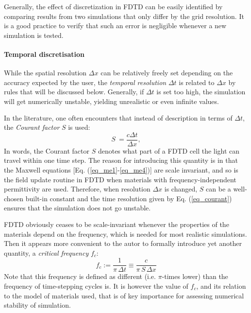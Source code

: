 Generally, the effect of discretization in FDTD can be easily identified by comparing results from two simulations that only differ by the grid resolution. It is a good practice to verify that such an error is negligible whenever a new simulation is tested.

\paragraph{Temporal discretisation} %
While the spatial resolution $\Delta x$ can be relatively freely set depending on the accuracy expected by the user, the \textit{temporal resolution} $\Delta t$ is related to $\Delta x$ by rules that will be discussed below. Generally, if $\Delta t$ is set too high, the simulation will get numerically unstable, yielding unrealistic or even infinite values.  %

In the literature, one often encounters that instead of description in terms of $\Delta t$, the \textit{Courant factor} $S$ is used:
\begin{equation} S~= \frac{c \Delta t}{\Delta x}, \label{eq_courant}\end{equation}
In words, the Courant factor $S$ denotes what part of a FDTD cell the light can travel within one time step. 
The reason for introducing this quantity is in that the Maxwell equations [Eq. (\ref{eq_me1}-\ref{eq_me4})] are scale invariant, and so is the field update routine in FDTD when materials with frequency-independent permittivity are used. Therefore, when resolution $\Delta x$ is changed, $S$ can be a well-chosen built-in constant and the time resolution given by Eq. (\ref{eq_courant}) ensures that the simulation does not go unstable.

FDTD obviously ceases to be scale-invariant whenever the properties of the materials depend on the frequency, which is needed for most realistic simulations. Then it appears more convenient to the autor to formally introduce yet another quantity, a \textit{critical frequency} $f_c$:
\begin{equation} f_c := \frac{1}{\pi \, \Delta t} \equiv \frac{c}{\pi\, S\, \Delta x} \label{eq_fc}\end{equation}
Note that this frequency is defined as different (i.e. $\pi$-times lower) than the frequency of time-stepping cycles is. It is however the value of $f_c$, and its relation to the model of materials used, that is of key importance for assessing numerical stability of simulation.

